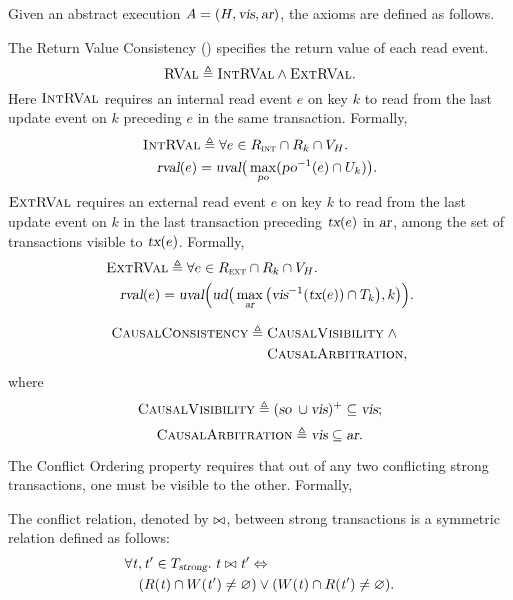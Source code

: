 Given an abstract execution $A = (H, \textsl{vis}, \textsl{ar})$,
the axioms are defined as follows.
\begin{appdefinition} \label{def:retval}
  The Return Value Consistency (\retval) specifies
  the return value of each read event.
  \[
    \textsc{RVal} \triangleq \textsc{IntRVal} \land \textsc{ExtRVal}.
  \]
  Here $\textsc{IntRVal}$ requires an internal read event $e$
  on key $k$ to read from the last update event on $k$ preceding $e$
  in the same transaction. Formally,
  \begin{align*}
    &\textsc{IntRVal} \triangleq \forall e \in R_{\textsc{int}} \cap R_{k} \cap V_{H}. \\
        &\quad \textsl{rval}(e) = \textsl{uval}\big(\max_{\textsl{po}}(\textsl{po}^{-1}(e) \cap U_{k})\big).
  \end{align*}
  $\textsc{ExtRVal}$ requires an external read event $e$
  on key $k$ to read from the last update event on $k$
  in the last transaction preceding $\textsl{tx}(e)$ in $\textsl{ar}$,
  among the set of transactions visible to $\textsl{tx}(e)$.
  Formally,
  \begin{align*}
    &\textsc{ExtRVal} \triangleq \forall e \in R_{\textsc{ext}} \cap R_{k} \cap V_{H}. \\
        &\quad \textsl{rval}(e) =
          \textsl{uval}\Big(
                \textsl{ud}\big(\max_{\textsl{ar}}\big(\textsl{vis}^{-1}(\textsl{tx}(e)) \cap T_{k}\big), k\big)
               \Big).
  \end{align*}
\end{appdefinition}

\begin{appdefinition} \label{def:cc}
  \begin{align*}
    \textsc{CausalConsistency} \triangleq\; &\textsc{CausalVisibility} \;\land \\
                   &\textsc{CausalArbitration},
  \end{align*}
  where
  \[
    \textsc{CausalVisibility} \triangleq (\textsl{so}\; \cup \textsl{vis})^{+} \subseteq \textsl{vis};
  \]
  \[
    \textsc{CausalArbitration} \triangleq \textsl{vis} \subseteq \textsl{ar}.
  \]
\end{appdefinition}

The Conflict Ordering property requires that
out of any two conflicting strong transactions,
one must be visible to the other.
Formally,
\begin{appdefinition} \label{def:conflict-relation-tx}
  The conflict relation, denoted by $\bowtie$, between strong transactions
  is a symmetric relation defined as follows:
  \begin{align*}
    &\forall \mathit{t}, \mathit{t}' \in T_{\textsl{strong}}.\; \mathit{t} \bowtie \mathit{t}' \Leftrightarrow \\
      &\quad (R(\mathit{t}) \cap W(\mathit{t}') \neq \varnothing) \lor
             (W(\mathit{t}) \cap R(\mathit{t}') \neq \varnothing).
  \end{align*}
\end{appdefinition}

